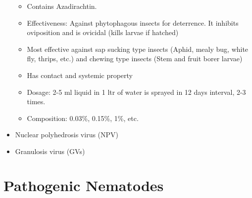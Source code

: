 \documentclass[
  openany]{book}
\providecommand{\tightlist}{%
  \setlength{\itemsep}{0pt}\setlength{\parskip}{0pt}}
\begin{document}
\begin{itemize}
  \begin{itemize}
  \tightlist
  \item
    Contains Azadirachtin.
  \item
    Effectiveness: Against phytophagous insects for deterrence. It inhibits oviposition and is ovicidal (kills larvae if hatched)
  \item
    Most effective against sap sucking type insects (Aphid, mealy bug, white fly, thrips, etc.) and chewing type insects (Stem and fruit borer larvae)
  \item
    Has contact and systemic property
  \item
    Dosage: 2-5 ml liquid in 1 ltr of water is sprayed in 12 days interval, 2-3 times.
  \item
    Composition: 0.03\%, 0.15\%, 1\%, etc.
  \end{itemize}
\item
  Nuclear polyhedrosis virus (NPV)
\item
  Granulosis virus (GVs)
\end{itemize}

\hypertarget{pathogenic-nematodes}{%
\section{Pathogenic Nematodes}\label{pathogenic-nematodes}}
\end{document}

